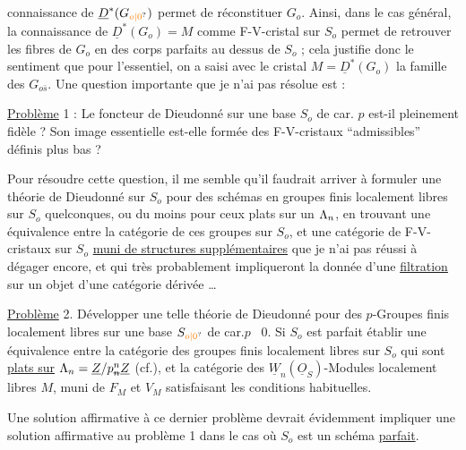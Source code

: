 connaissance de $\underline{D}^{*}(G_{\unsure{o|0}})$ permet de réconstituer $G_o$. Ainsi, dans le cas général, la connaissance de $\underline{D}^{*}(G_o)=M$ comme F-V-cristal sur $S_o$ permet de retrouver les fibres de $G_o$ en des corps parfaits au dessus de $S_o$ ; cela justifie donc le sentiment que pour l'essentiel, on a saisi avec le cristal $M=\underline{D}^{*}(G_o)$ la famille des $G_{o\bar{s}}$. Une question importante  que je n'ai pas résolue est :

\uline{Problème} 1 : Le foncteur de Dieudonné sur une base $S_o$ de car. $p$ est-il pleinement fidèle ?  Son image essentielle est-elle formée des F-V-cristaux ``admissibles'' définis plus bas ?

Pour résoudre cette question, il me semble qu'il faudrait arriver à formuler une théorie de Dieudonné sur  $S_o$ pour des schémas en groupes finis localement libres sur $S_o$ quelconques, ou du moins pour ceux plats sur un $\Lambda_n$, en trouvant une équivalence entre  la catégorie de ces groupes sur $S_o$, et une catégorie de F-V-cristaux sur $S_o$ \uline{muni de structures supplémentaires} que je n'ai pas réussi à dégager encore, et qui très probablement impliqueront la donnée d'une \uline{filtration} sur un objet  d'une catégorie dérivée \ldots

\uline{Problème} 2. Développer une telle théorie de Dieudonné pour des $p$-Groupes finis localement libres sur une base $S_{\unsure{o|0}}$ de car.$p$ \ $0$. Si $S_o$ est parfait établir une équivalence entre la catégorie des groupes finis localement libres sur $S_o$ qui sont \uline{plats sur} $\handwritten{\Lambda}_n=\underline{Z}/p_{\deleted{n}}^n\underline{Z}$ (cf.\qquad), et la catégorie des $\underline{W}_n(\underline{O}_S)$-Modules localement libres $M$, muni de $F_M$ et $V_M$  satisfaisant les conditions habituelles.

Une solution affirmative à ce dernier problème devrait évidemment impliquer une solution affirmative au problème 1 dans le cas où $S_o$ est un schéma \uline{parfait}.


